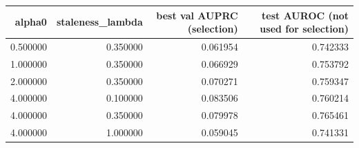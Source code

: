\begin{tabular}{rrrr}
\toprule
alpha0 & staleness\_lambda & best val AUPRC (selection) & test AUROC (not used for selection) \\
\midrule
0.500000 & 0.350000 & 0.061954 & 0.742333 \\
1.000000 & 0.350000 & 0.066929 & 0.753792 \\
2.000000 & 0.350000 & 0.070271 & 0.759347 \\
4.000000 & 0.100000 & 0.083506 & 0.760214 \\
4.000000 & 0.350000 & 0.079978 & 0.765461 \\
4.000000 & 1.000000 & 0.059045 & 0.741331 \\
\bottomrule
\end{tabular}
